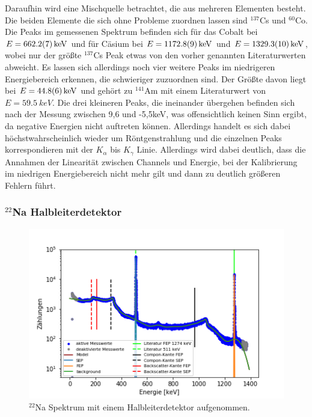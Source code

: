 Daraufhin wird eine Mischquelle betrachtet, die aus mehreren Elementen besteht. Die beiden Elemente die sich ohne Probleme zuordnen lassen sind $^{137}$Cs und $^{60}$Co. Die Peaks im gemessenen Spektrum befinden sich für das Cobalt bei $E = \SI{662,2 \pm 0,7}{keV}$ und für Cäsium bei $E = \SI{1172,8 \pm 0,9}{keV}$ und $E = \SI{1329,3 \pm 1}{keV}$, wobei nur der größte $^{137}$Cs Peak etwas von den vorher genannten Literaturwerten abweicht. Es lassen sich allerdings noch vier weitere Peaks im niedrigeren Energiebereich erkennen, die schwieriger zuzuordnen sind. Der Größte davon liegt bei $E = \SI{44,8 \pm 0,6}{keV}$ und gehört zu $^{141}$Am mit einem Literaturwert von $E = \SI{59,5}{keV}$. Die drei kleineren Peaks, die ineinander übergehen befinden sich nach der Messung zwischen 9,6 und -5,5keV, was offensichtlich keinen Sinn ergibt, da negative Energien nicht auftreten können. Allerdings handelt es sich dabei höchstwahrscheinlich wieder um Röntgenstrahlung und die einzelnen Peaks korrespondieren mit der $K_{\alpha}$ bis $K_{\gamma}$ Linie. Allerdings wird dabei deutlich, dass die Annahmen der Linearität zwischen Channels und Energie, bei der Kalibrierung im niedrigen Energiebereich nicht mehr gilt und dann zu deutlich größeren Fehlern führt.








\subsubsection{$^{22}$Na Halbleiterdetektor}

\begin{figure}[ht]
	\centering
	\includegraphics[scale=0.8]{na_pn_.png}
	\caption{$^{22}$Na Spektrum mit einem Halbleiterdetektor aufgenommen.}
	\label{na_pn}
\end{figure}

